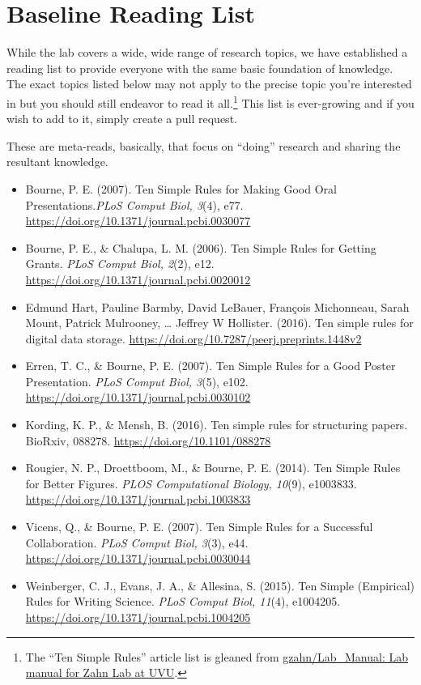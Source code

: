 \documentclass[]{tufte-book}
\providecommand{\tightlist}{%
  \setlength{\itemsep}{0pt}\setlength{\parskip}{0pt}}
\begin{document}
\hypertarget{baseline-reading-list}{%
\section{Baseline Reading List}\label{baseline-reading-list}}

While the lab covers a wide, wide range of research topics, we have established a reading list to provide everyone with the same basic foundation of knowledge. The exact topics listed below may not apply to the precise topic you're interested in but you should still endeavor to read it all.\footnote{The ``Ten Simple Rules'' article list is gleaned from \href{https://github.com/gzahn/Lab_Manual\#09-reading-list}{gzahn/Lab\_Manual: Lab manual for Zahn Lab at UVU}.} This list is ever-growing and if you wish to add to it, simply create a pull request.

These are meta-reads, basically, that focus on ``doing'' research and sharing the resultant knowledge.

\begin{itemize}
\tightlist
\item
  Bourne, P. E. (2007). Ten Simple Rules for Making Good Oral Presentations.\emph{PLoS Comput Biol, 3}(4), e77. \url{https://doi.org/10.1371/journal.pcbi.0030077}
\item
  Bourne, P. E., \& Chalupa, L. M. (2006). Ten Simple Rules for Getting Grants. \emph{PLoS Comput Biol, 2}(2), e12. \url{https://doi.org/10.1371/journal.pcbi.0020012}
\item
  Edmund Hart, Pauline Barmby, David LeBauer, François Michonneau, Sarah Mount, Patrick Mulrooney, \ldots{} Jeffrey W Hollister. (2016). Ten simple rules for digital data storage. \url{https://doi.org/10.7287/peerj.preprints.1448v2}
\item
  Erren, T. C., \& Bourne, P. E. (2007). Ten Simple Rules for a Good Poster Presentation. \emph{PLoS Comput Biol, 3}(5), e102. \url{https://doi.org/10.1371/journal.pcbi.0030102}
\item
  Kording, K. P., \& Mensh, B. (2016). Ten simple rules for structuring papers. BioRxiv, 088278. \url{https://doi.org/10.1101/088278}
\item
  Rougier, N. P., Droettboom, M., \& Bourne, P. E. (2014). Ten Simple Rules for Better Figures. \emph{PLOS Computational Biology, 10}(9), e1003833. \url{https://doi.org/10.1371/journal.pcbi.1003833}
\item
  Vicens, Q., \& Bourne, P. E. (2007). Ten Simple Rules for a Successful Collaboration. \emph{PLoS Comput Biol, 3}(3), e44. \url{https://doi.org/10.1371/journal.pcbi.0030044}
\item
  Weinberger, C. J., Evans, J. A., \& Allesina, S. (2015). Ten Simple (Empirical) Rules for Writing Science. \emph{PLoS Comput Biol, 11}(4), e1004205. \url{https://doi.org/10.1371/journal.pcbi.1004205}
\end{itemize}
\end{document}
